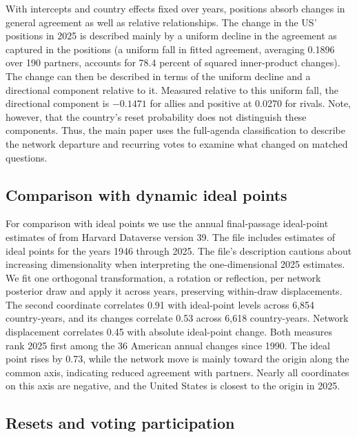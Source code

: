 \documentclass[10pt,authoryear]{elsarticle}
\begin{document}
With intercepts and country effects fixed over years, positions absorb changes in general agreement as well as relative relationships. The change in the US’ positions in 2025 is described mainly by a uniform decline in the agreement as captured in the positions (a uniform fall in fitted agreement, averaging 0.1896 over 190 partners, accounts for 78.4 percent of squared inner-product changes). The change can then be described in terms of the uniform decline and a directional component relative to it. Measured relative to this uniform fall, the directional component is $-0.1471$ for allies and positive at 0.0270 for rivals. Note, however, that the country’s reset probability does not distinguish these components. Thus, the main paper uses the full-agenda classification to describe the network departure and recurring votes to examine what changed on matched questions.

\subsection{Comparison with dynamic ideal points}

For comparison with ideal points we use the annual final-passage ideal-point estimates of \citet{bailey:strezhnev:voeten:2017} from Harvard Dataverse version 39. The file includes estimates of ideal points for the years 1946 through 2025. The file’s description cautions about increasing dimensionality when interpreting the one-dimensional 2025 estimates. We fit one orthogonal transformation, a rotation or reflection, per network posterior draw and apply it across years, preserving within-draw displacements. The second coordinate correlates 0.91 with ideal-point levels across 6,854 country-years, and its changes correlate 0.53 across 6,618 country-years. Network displacement correlates 0.45 with absolute ideal-point change. Both measures rank 2025 first among the 36 American annual changes since 1990. The ideal point rises by 0.73, while the network move is mainly toward the origin along the common axis, indicating reduced agreement with partners. Nearly all coordinates on this axis are negative, and the United States is closest to the origin in 2025.

\subsection{Resets and voting participation}
\label{sec:reset-participation}
\end{document}
